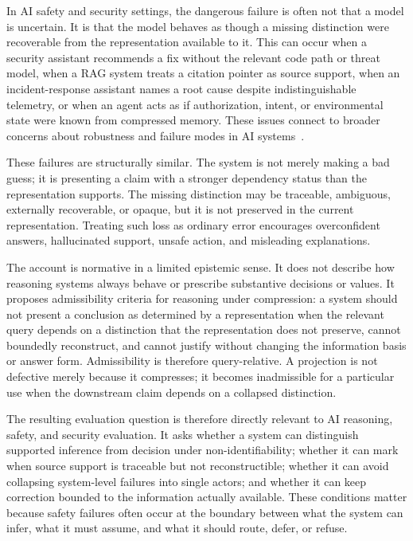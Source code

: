 \documentclass[11pt]{article}
\begin{document}
In AI safety and security settings, the dangerous failure is often not that a model is uncertain. It is that the model behaves as though a missing distinction were recoverable from the representation available to it. This can occur when a security assistant recommends a fix without the relevant code path or threat model, when a RAG system treats a citation pointer as source support, when an incident-response assistant names a root cause despite indistinguishable telemetry, or when an agent acts as if authorization, intent, or environmental state were known from compressed memory. These issues connect to broader concerns about robustness and failure modes in AI systems~\cite{Amodei2016}.

These failures are structurally similar. The system is not merely making a bad guess; it is presenting a claim with a stronger dependency status than the representation supports. The missing distinction may be traceable, ambiguous, externally recoverable, or opaque, but it is not preserved in the current representation. Treating such loss as ordinary error encourages overconfident answers, hallucinated support, unsafe action, and misleading explanations.

The account is normative in a limited epistemic sense. It does not describe how reasoning systems always behave or prescribe substantive decisions or values. It proposes admissibility criteria for reasoning under compression: a system should not present a conclusion as determined by a representation when the relevant query depends on a distinction that the representation does not preserve, cannot boundedly reconstruct, and cannot justify without changing the information basis or answer form. Admissibility is therefore query-relative. A projection is not defective merely because it compresses; it becomes inadmissible for a particular use when the downstream claim depends on a collapsed distinction.

The resulting evaluation question is therefore directly relevant to AI reasoning, safety, and security evaluation. It asks whether a system can distinguish supported inference from decision under non-identifiability; whether it can mark when source support is traceable but not reconstructible; whether it can avoid collapsing system-level failures into single actors; and whether it can keep correction bounded to the information actually available. These conditions matter because safety failures often occur at the boundary between what the system can infer, what it must assume, and what it should route, defer, or refuse.
\end{document}
